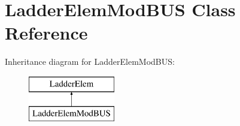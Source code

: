 \hypertarget{class_ladder_elem_mod_b_u_s}{\section{Ladder\-Elem\-Mod\-B\-U\-S Class Reference}
\label{class_ladder_elem_mod_b_u_s}
}
Inheritance diagram for Ladder\-Elem\-Mod\-B\-U\-S\-:\begin{figure}[H]
\begin{center}
\leavevmode
\includegraphics[height=2.000000cm]{class_ladder_elem_mod_b_u_s}
\end{center}
\end{figure}
